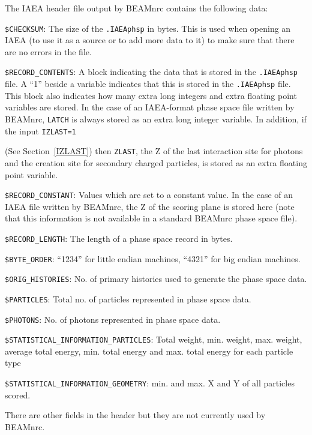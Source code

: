 \documentclass[12pt,twoside]{article}
\begin{document}
The IAEA header file output by BEAMnrc contains the following data:\\
\begin{description}
\item {\tt \$CHECKSUM}: The size of the {\tt .IAEAphsp} in bytes.  This is
used when opening an IAEA (to use it as a source or to add more data to it) to make
sure that there are no errors in the file.
\item {\tt \$RECORD\_CONTENTS}: A block indicating the data that is stored in
the {\tt .IAEAphsp} file.  A ``1'' beside a variable indicates that this is stored
in the {\tt .IAEAphsp} file.  This block also indicates how many extra long integers
and extra floating point variables are stored.  In the case of an IAEA-format
phase space file written by BEAMnrc, {\tt LATCH} is always stored as an extra
long integer variable. In addition, if the input {\tt IZLAST=1}

(See Section~\ref{IZLAST}) then {\tt ZLAST}, the Z of the last interaction site for
photons and the creation site for secondary charged particles, is stored as an
extra floating point variable.
\item {\tt \$RECORD\_CONSTANT}: Values which are set to a constant value.  In the case of
an IAEA file written by BEAMnrc, the Z of the scoring plane is stored here (note that this information is not
available in a standard BEAMnrc phase space file).
\item {\tt \$RECORD\_LENGTH}: The length of a phase space record in bytes.
\item {\tt \$BYTE\_ORDER}: ``1234'' for little endian machines, ``4321'' for big
endian machines.
\item {\tt \$ORIG\_HISTORIES}: No. of primary histories used to generate the phase space data.
\item {\tt \$PARTICLES}: Total no. of particles represented in phase space data.
\item {\tt \$PHOTONS}: No. of photons represented in phase space data.
\item {\tt \$STATISTICAL\_INFORMATION\_PARTICLES}: Total weight, min. weight, max. weight, average total energy, min. total energy and max. total energy for each particle type
\item {\tt \$STATISTICAL\_INFORMATION\_GEOMETRY}: min. and max. X and Y of all particles scored.
\end{description}
There are other fields in the header but they are not currently used by BEAMnrc.
\end{document}
